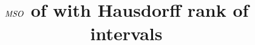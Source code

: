 \documentclass{article}
\title{$\mathit{MSO}$ of with Hausdorff rank of intervals}
\begin{document}
\maketitle
\begin{abstract}
\end{abstract}
\tableofcontents



 
%
 
 
%

 
\end{document}
